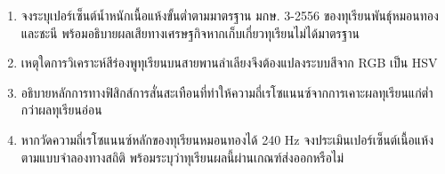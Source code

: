 \begin{enumerate}
    \item จงระบุเปอร์เซ็นต์น้ำหนักเนื้อแห้งขั้นต่ำตามมาตรฐาน มกษ. 3-2556 ของทุเรียนพันธุ์หมอนทองและชะนี พร้อมอธิบายผลเสียทางเศรษฐกิจหากเก็บเกี่ยวทุเรียนไม่ได้มาตรฐาน
    \item เหตุใดการวิเคราะห์สีร่องพูทุเรียนบนสายพานลำเลียงจึงต้องแปลงระบบสีจาก RGB เป็น HSV
    \item อธิบายหลักการทางฟิสิกส์การสั่นสะเทือนที่ทำให้ความถี่เรโซแนนซ์จากการเคาะผลทุเรียนแก่ต่ำกว่าผลทุเรียนอ่อน
    \item หากวัดความถี่เรโซแนนซ์หลักของทุเรียนหมอนทองได้ 240 Hz จงประเมินเปอร์เซ็นต์เนื้อแห้งตามแบบจำลองทางสถิติ พร้อมระบุว่าทุเรียนผลนี้ผ่านเกณฑ์ส่งออกหรือไม่
\end{enumerate}
\clearpage
